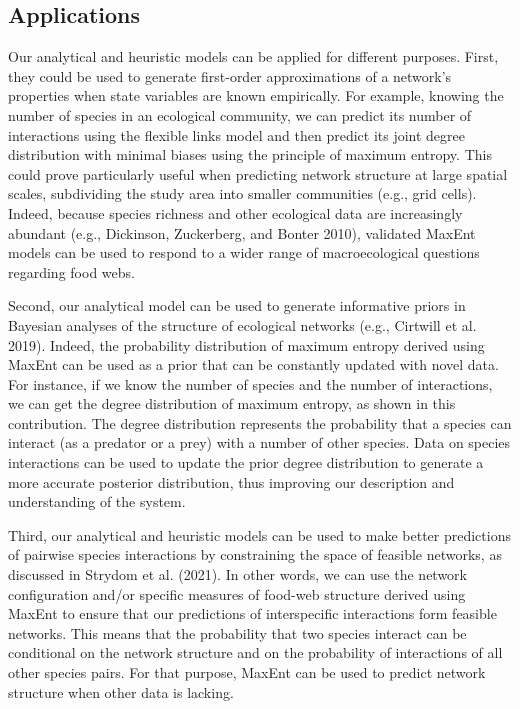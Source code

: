 \documentclass[11pt]{article}
\begin{document}
\hypertarget{applications}{%
\subsection{Applications}\label{applications}}

Our analytical and heuristic models can be applied for different
purposes. First, they could be used to generate first-order
approximations of a network's properties when state variables are known
empirically. For example, knowing the number of species in an ecological
community, we can predict its number of interactions using the flexible
links model and then predict its joint degree distribution with minimal
biases using the principle of maximum entropy. This could prove
particularly useful when predicting network structure at large spatial
scales, subdividing the study area into smaller communities (e.g., grid
cells). Indeed, because species richness and other ecological data are
increasingly abundant (e.g., Dickinson, Zuckerberg, and Bonter 2010),
validated MaxEnt models can be used to respond to a wider range of
macroecological questions regarding food webs.

Second, our analytical model can be used to generate informative priors
in Bayesian analyses of the structure of ecological networks (e.g.,
Cirtwill et al. 2019). Indeed, the probability distribution of maximum
entropy derived using MaxEnt can be used as a prior that can be
constantly updated with novel data. For instance, if we know the number
of species and the number of interactions, we can get the degree
distribution of maximum entropy, as shown in this contribution. The
degree distribution represents the probability that a species can
interact (as a predator or a prey) with a number of other species. Data
on species interactions can be used to update the prior degree
distribution to generate a more accurate posterior distribution, thus
improving our description and understanding of the system.

Third, our analytical and heuristic models can be used to make better
predictions of pairwise species interactions by constraining the space
of feasible networks, as discussed in Strydom et al. (2021). In other
words, we can use the network configuration and/or specific measures of
food-web structure derived using MaxEnt to ensure that our predictions
of interspecific interactions form feasible networks. This means that
the probability that two species interact can be conditional on the
network structure and on the probability of interactions of all other
species pairs. For that purpose, MaxEnt can be used to predict network
structure when other data is lacking.
\end{document}
